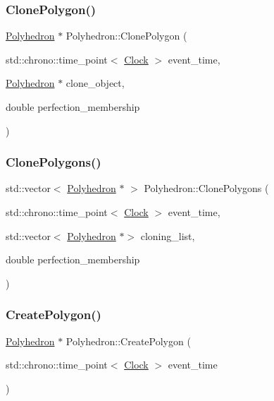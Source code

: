 \subsubsection{\texorpdfstring{Clone\+Polygon()}{ClonePolygon()}}
{\footnotesize\ttfamily \mbox{\hyperlink{classPolyhedron}{Polyhedron}} $\ast$ Polyhedron\+::\+Clone\+Polygon (\begin{DoxyParamCaption}\item[{std\+::chrono\+::time\+\_\+point$<$ \mbox{\hyperlink{universe_8h_a0ef8d951d1ca5ab3cfaf7ab4c7a6fd80}{Clock}} $>$}]{event\+\_\+time,  }\item[{\mbox{\hyperlink{classPolyhedron}{Polyhedron}} $\ast$}]{clone\+\_\+object,  }\item[{double}]{perfection\+\_\+membership }\end{DoxyParamCaption})}

\mbox{\label{classPolyhedron_ab4f57da9595dc92de7340cc46237a2ea}} 
\subsubsection{\texorpdfstring{Clone\+Polygons()}{ClonePolygons()}}
{\footnotesize\ttfamily std\+::vector$<$ \mbox{\hyperlink{classPolyhedron}{Polyhedron}} $\ast$ $>$ Polyhedron\+::\+Clone\+Polygons (\begin{DoxyParamCaption}\item[{std\+::chrono\+::time\+\_\+point$<$ \mbox{\hyperlink{universe_8h_a0ef8d951d1ca5ab3cfaf7ab4c7a6fd80}{Clock}} $>$}]{event\+\_\+time,  }\item[{std\+::vector$<$ \mbox{\hyperlink{classPolyhedron}{Polyhedron}} $\ast$$>$}]{cloning\+\_\+list,  }\item[{double}]{perfection\+\_\+membership }\end{DoxyParamCaption})}

\mbox{\label{classPolyhedron_ae5852dd26065d9f38ed293f8d95106ad}} 
\subsubsection{\texorpdfstring{Create\+Polygon()}{CreatePolygon()}}
{\footnotesize\ttfamily \mbox{\hyperlink{classPolyhedron}{Polyhedron}} $\ast$ Polyhedron\+::\+Create\+Polygon (\begin{DoxyParamCaption}\item[{std\+::chrono\+::time\+\_\+point$<$ \mbox{\hyperlink{universe_8h_a0ef8d951d1ca5ab3cfaf7ab4c7a6fd80}{Clock}} $>$}]{event\+\_\+time }\end{DoxyParamCaption})}

